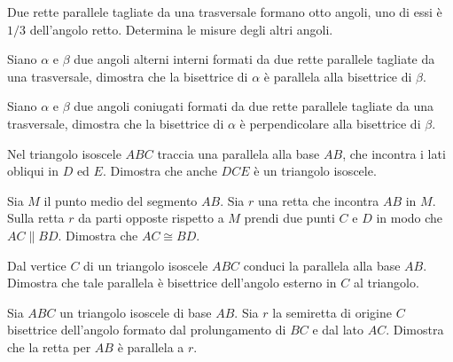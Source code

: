 \begin{multicols}{2}

\begin{esercizio}
	\label{ese:3.39}
	Due rette parallele tagliate da una trasversale formano otto angoli, 
	uno di essi è $1/3$ dell'angolo retto. Determina le misure degli 
	altri angoli.
\end{esercizio}

\begin{esercizio}
	\label{ese:3.40}
	Siano $\alpha$ e $\beta$ due angoli alterni interni formati da due 
	rette parallele tagliate da una trasversale, dimostra che la 
	bisettrice di $\alpha$ è parallela alla bisettrice di $\beta$.
\end{esercizio}

\begin{esercizio}
	\label{ese:3.41}
	Siano $\alpha$ e $\beta$ due angoli coniugati formati da due rette 
	parallele tagliate da una trasversale, dimostra che la bisettrice di 
	$\alpha$ è perpendicolare alla bisettrice di $\beta$.
\end{esercizio}

\begin{esercizio}
\label{ese:3.24}
Nel triangolo isoscele $ABC$ traccia una parallela alla base $AB$, 
che incontra i lati obliqui in $D$ ed $E$. Dimostra che anche $DCE$ è 
un triangolo isoscele.
\end{esercizio}

\begin{esercizio}
\label{ese:3.26}
Sia $M$ il punto medio del segmento $AB$. Sia $r$ una retta che 
incontra $AB$ in $M$. Sulla retta $r$ da parti opposte rispetto a $M$ 
prendi due punti $C$ e $D$ in modo che $AC\parallel BD$. Dimostra che 
$AC\cong BD$. 
\end{esercizio}

\begin{esercizio}
\label{ese:3.27}
Dal vertice $C$ di un triangolo isoscele $ABC$ conduci la parallela 
alla base $AB$. Dimostra che tale parallela è bisettrice dell'angolo 
esterno in $C$ al triangolo.
\end{esercizio}

\begin{esercizio}
\label{ese:3.28}
Sia $ABC$ un triangolo isoscele di base $AB$. Sia $r$ la semiretta di 
origine $C$ bisettrice dell'angolo formato dal prolungamento di $BC$ 
e dal lato $AC$. Dimostra che la retta per $AB$ è parallela a $r$.
\end{esercizio}


\end{multicols}
